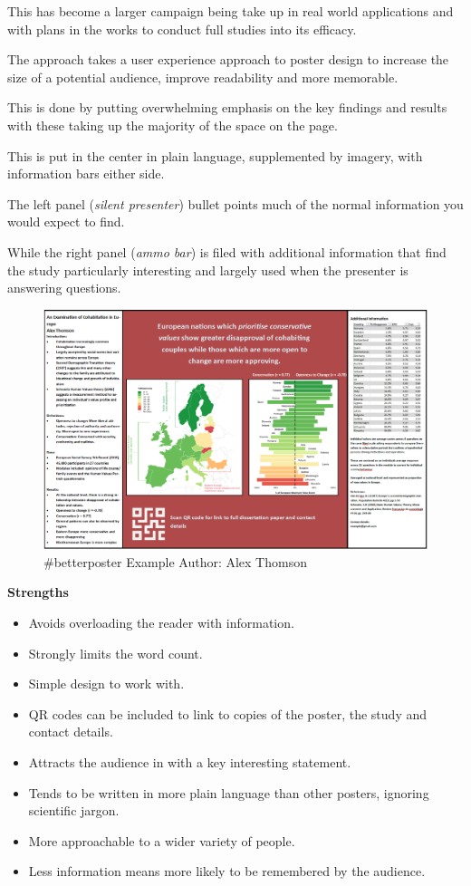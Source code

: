 \documentclass[
]{book}
\providecommand{\tightlist}{%
  \setlength{\itemsep}{0pt}\setlength{\parskip}{0pt}}
\begin{document}
This has become a larger campaign being take up in real world applications and with plans in the works to conduct full studies into its efficacy.

The approach takes a user experience approach to poster design to increase the size of a potential audience, improve readability and more memorable.

This is done by putting overwhelming emphasis on the key findings and results with these taking up the majority of the space on the page.

This is put in the center in plain language, supplemented by imagery, with information bars either side.

The left panel (\emph{silent presenter}) bullet points much of the normal information you would expect to find.

While the right panel (\emph{ammo bar}) is filed with additional information that find the study particularly interesting and largely used when the presenter is answering questions.

\begin{figure}
\centering
\includegraphics{img/better poster example 1.png}
\caption{\#betterposter Example Author: Alex Thomson}
\end{figure}

\textbf{Strengths}

\begin{itemize}
\tightlist
\item
  Avoids overloading the reader with information.
\item
  Strongly limits the word count.
\item
  Simple design to work with.
\item
  QR codes can be included to link to copies of the poster, the study and contact details.
\item
  Attracts the audience in with a key interesting statement.
\item
  Tends to be written in more plain language than other posters, ignoring scientific jargon.
\item
  More approachable to a wider variety of people.
\item
  Less information means more likely to be remembered by the audience.
\end{itemize}
\end{document}
